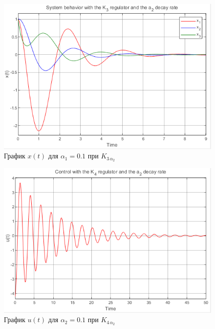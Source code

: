 \documentclass[a4paper, 12pt]{article}
\begin{document}
    \begin{figure}[H]
        \centering
        \includegraphics{1task_K3a2_x.png}
        \captionsetup{skip=0pt}
        \caption{График $x(t)$ для $\alpha_1=0.1$ при $K_{3\,\alpha_2}$}
        \label{fig:1task_K3a2_x}
    \end{figure}
    \newpage
    \vspace*{0.01mm}
    \begin{figure}[H]
        \centering
        \includegraphics{1task_K4a2_u.png}
        \captionsetup{skip=0pt}
        \caption{График $u(t)$ для $\alpha_2=0.1$ при $K_{4\,\alpha_2}$}
        \label{fig:1task_K4a2_u}
    \end{figure}
\end{document}
